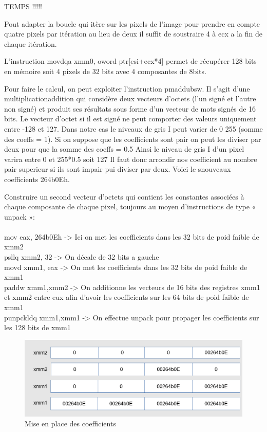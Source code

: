 \documentclass[11pt]{report}
\begin{document}
TEMPS !!!!!

\newpage
Pout adapter la boucle qui itère sur les pixels de l’image pour prendre en compte quatre pixels par itération
au lieu de deux il suffit de soustraire 4 à ecx a la fin de chaque itération.

L'instruction movdqa xmm0, oword ptr[esi+ecx*4] permet de récupérer 128 bits en mémoire soit 4 pixels de 32 bits avec 4 composantes de 8bits.

Pour faire le calcul, on peut exploiter l’instruction pmaddubsw. Il s’agit d’une multiplicationaddition
qui considère deux vecteurs d’octets (l’un signé et l’autre non signé) et
produit ses résultats sous forme d’un vecteur de mots signés de 16 bits. Le vecteur d'octet si il est signé ne peut comporter des valeurs uniquement entre -128 et 127.
Dans notre cas le niveaux de gris I peut varier de 0 255 (somme des coeffs = 1).
Si on suppose que les coefficients sont pair on peut les diviser par deux pour que la somme des coeffs = 0.5
Ainsi le niveau de gris I d'un pixel varira entre 0 et 255*0.5 soit 127
Il faut donc arrondir nos coefficient au nombre pair superieur si ils sont impair pui diviser par deux.
Voici le snouveaux coefficients 264b0Eh.

Construire un second vecteur d’octets qui contient les constantes associées à chaque
composante de chaque pixel, toujours au moyen d’instructions de type « unpack »:
\\
\\mov eax, 264b0Eh
-> Ici on met les coefficients dans les 32 bits de poid faible de xmm2
\\psllq xmm2, 32
-> On décale de 32 bits a gauche
\\movd xmm1, eax
-> On met les coefficients dans les 32 bits de poid faible de xmm1
\\paddw xmm1,xmm2
-> On additionne les vecteurs de 16 bits des registres xmm1 et xmm2 entre eux afin d'avoir les coefficients sur les 64 bits de poid faible de xmm1
\\punpckldq xmm1,xmm1
-> On effectue unpack pour propager les coefficients sur les 128 bits de xmm1

\begin{figure}[h]
\includegraphics[width=13cm]{Capture1.png}
\caption{Mise en place des coefficients}
\end{figure}
\end{document}
